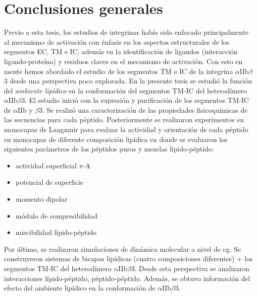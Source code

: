 \chapter{Conclusiones generales}

	Previo a esta tesis, los estudios de integrinas había sido enfocado principalmente al mecanismo de activación con énfasis en los aspectos estructurales de los segmentos EC, TM e IC, además en la identificación de ligandos (interacción ligando-proteína) y residuos claves en el mecanismo de activación. Con esto en mente hemos abordado el estudio de los segmentos TM e IC de la integrina $\alpha$IIb$\beta$3 desde una perspectiva poco explorada. En la presente tesis se estudió la función del \textit{ambiente lipídico} en la conformación del segmentos TM-IC del heterodímero $\alpha$IIb$\beta$3. El estudio  inició con la expresión y purificación de los segmentos TM-IC de $\alpha$IIb y $\beta$3. Se realizó una caracterización de las propiedades fisicoquímicas de las secuencias para cada péptido. Posteriormente se realizaron experimentos en monocapas de Langmuir para evaluar la actividad y orientación de cada péptido en monocapas de diferente composición lipídica en donde se evaluaron los siguientes parámetros de los péptidos puros y mezclas lípido-péptido:

      \begin{itemize}
        \item{actividad superficial $\pi$-A}
        \item{potencial de superficie}
        \item{momento dipolar}
        \item{módulo de compresibilidad}
        \item{miscibilidad lípido-péptido}
      \end{itemize}
      
    Por último, se realizaron simulaciones de dinámica molecular a nivel de \acf{cg}. Se construyeron sistemas de bicapas lipídicas (cuatro composiciones diferentes)  + los segmentos TM-IC del heterodímero $\alpha$IIb$\beta$3. Desde esta perspectiva se analizaron interacciones lípido-péptido, péptido-péptido. Además, se obtuvo información del efecto del ambiente lipídico en la conformación de $\alpha$IIb$\beta$3.
    
